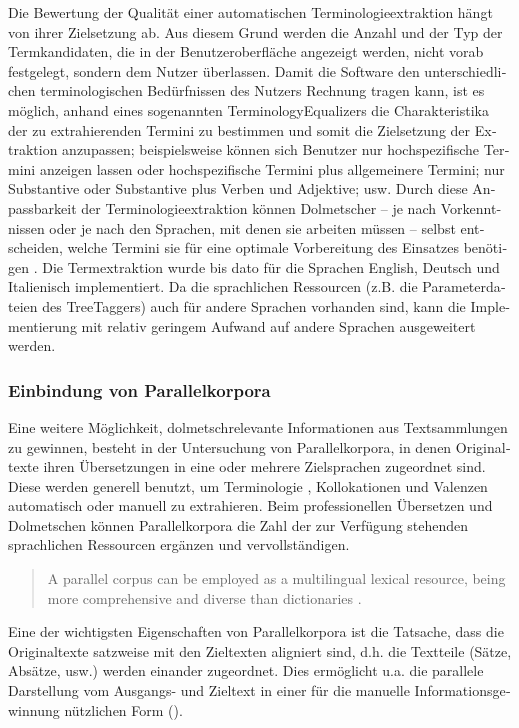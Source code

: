 \documentclass[output=paper]{LSP/langsci}
\begin{document}
\begin{otherlanguage}{ngerman}
Die Bewertung der Qualität einer automatischen Terminologieextraktion hängt von ihrer Zielsetzung ab. Aus diesem Grund werden die Anzahl und der Typ der Termkandidaten, die in der Benutzeroberfläche angezeigt werden, nicht vorab festgelegt, sondern dem Nutzer überlassen. Damit die Software den unterschiedlichen terminologischen Bedürfnissen des Nutzers Rechnung tragen kann, ist es möglich, anhand eines sogenannten TerminologyEqualizers die Charakteristika der zu extrahierenden Termini zu bestimmen und somit die Zielsetzung der Extraktion anzupassen; beispielsweise können sich Benutzer nur hochspezifische Termini anzeigen lassen oder hochspezifische Termini plus allgemeinere Termini; nur Substantive oder Substantive plus Verben und Adjektive; usw. Durch diese Anpassbarkeit der Terminologieextraktion können Dolmetscher -- je nach Vorkenntnissen oder je nach den Sprachen, mit denen sie arbeiten müssen -- selbst entscheiden, welche Termini sie für eine optimale Vorbereitung des Einsatzes benötigen \citep{Fantinuoli2006}. Die Termextraktion wurde bis dato für die Sprachen English, Deutsch und Italienisch implementiert. Da die sprachlichen Ressourcen (z.B. die Parameterdateien des TreeTaggers) auch für andere Sprachen vorhanden sind, kann die Implementierung mit relativ geringem Aufwand auf andere Sprachen ausgeweitert werden.

\subsubsection{Einbindung von Parallelkorpora}\label{sec:fantinuoli:6.1.3}

Eine weitere Möglichkeit, dolmetschrelevante Informationen aus Textsammlungen zu gewinnen, besteht in der Untersuchung von Parallelkorpora, in denen Originaltexte ihren Übersetzungen in eine oder mehrere Zielsprachen zugeordnet sind. Diese werden generell benutzt, um Terminologie \citep{Pearson2003}, Kollokationen \citep{Teubert2003} und Valenzen \citep{culo_automatische_2011} automatisch oder manuell zu extrahieren. Beim professionellen Übersetzen und Dolmetschen können Parallelkorpora die Zahl der zur Verfügung stehenden sprachlichen Ressourcen ergänzen und vervollständigen.

\begin{quote}
A parallel corpus can be employed as a multilingual lexical resource, being more comprehensive and diverse than dictionaries \citep[1168]{Hansen-Schirra2008}.
\end{quote}

Eine der wichtigsten Eigenschaften von Parallelkorpora ist die Tatsache, dass die Originaltexte satzweise mit den Zieltexten aligniert sind, d.h. die Textteile (Sätze, Absätze, usw.) werden einander zugeordnet. Dies ermöglicht u.a. die parallele Darstellung vom Ausgangs- und Zieltext in einer für die manuelle Informationsgewinnung nützlichen Form ().


\end{otherlanguage}
\end{document}
